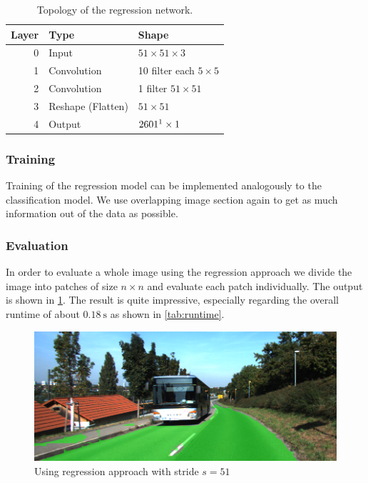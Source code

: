 \begin{savenotes}
\begin{table}[H]
    \normalsize
    \centering
    \begin{tabular}{r l l}
        \toprule
        \textbf{Layer} & \textbf{Type}  & \textbf{Shape}  \\
        \midrule
        0     & Input &  $51 \times 51 \times 3$ \\
        1     & Convolution & 10 filter  each $5 \times 5$ \\
        2     & Convolution & 1 filter $51 \times 51$  \\
        3     & Reshape (Flatten) & $51 \times 51$ \\
        4     & Output     & $2601\footnotemark \times 1$\\
        \bottomrule
    \end{tabular}
    \caption{Topology of the regression network.}%
\label{tab:topo2}
\end{table}
\end{savenotes}


\subsubsection{Training}
Training of the regression model can be implemented analogously to the
classification model. We use overlapping image section again to get as much
information out of the data as possible.

\subsubsection{Evaluation}
In order to evaluate a whole image using the regression approach we divide the
image into patches of size $n \times n$ and evaluate each patch individually.
The output is shown in \cref{fig:reg_stride2}. The result is quite impressive,
especially regarding the overall runtime of about $\SI{0.18}{\second}$ as shown
in \cref{tab:runtime}.

\begin{figure}[]
    \centering
    \includegraphics[width=\columnwidth]{figures/models/testing2-um_32_conv_stride51.png}
    \caption{Using regression approach with stride $s=51$}%
\label{fig:reg_stride2}
\end{figure}


